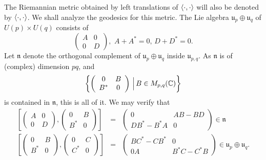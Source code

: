 \hf The Riemannian metric obtained by left translations of $\left\langle\cdot,\cdot\right\rangle$ will also be denoted by $\left\langle \cdot,\cdot\right\rangle$. We shall analyze the geodesics for this metric. The Lie algebra $\mathfrak{u}_p\oplus \mathfrak{u}_q$ of $U(p)\times U(q)$ consists of 
\begin{displaymath}
    \left(
        \begin{array}{cc}
            A & 0 \\
            0 & D
        \end{array}\right),\,\,A+A^\ast=0,\,D+D^\ast =0.
\end{displaymath}
Let $\mathfrak{n}$ denote the orthogonal complement of $\mathfrak{u}_p\oplus \mathfrak{u}_q$ inside $\mathfrak{u}_{p,q}$. As $\mathfrak{n}$ is of (complex) dimension $pq$, and 
\begin{displaymath}
    \left\{\left(
        \begin{array}{cc}
            0 & B\\
            B^\ast & 0
        \end{array}\right)\,\Big|\,B\in M_{p,q}(\mathbb{C})\right\}
\end{displaymath}
is contained in $\mathfrak{n}$, this is all of it. We may verify that
\begin{eqnarray*}
    \left[ \left(\begin{array}{cc}
    A & 0\\
    0 & D
    \end{array}\right),\left(\begin{array}{cc}
    0 & B\\
    B^\ast & 0
    \end{array}\right)\right] & = & \left(\begin{array}{cc}
    0 & AB-BD\\
    DB^\ast-B^\ast A & 0
    \end{array}\right)\in\mathfrak{n}\\
    \left[ \left(\begin{array}{cc}
    0 & B\\
    B^\ast & 0
    \end{array}\right),\left(\begin{array}{cc}
    0 & C\\
    C^\ast & 0
    \end{array}\right)\right] & = & \left(\begin{array}{cc}
    BC^\ast-CB^\ast & 0\\
    0 A & B^\ast C-C^\ast B
    \end{array}\right)\in\mathfrak{u}_p\oplus \mathfrak{u}_q.
\end{eqnarray*}
